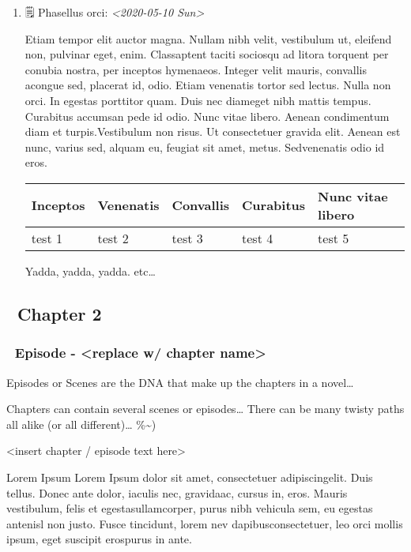 \documentclass[11pt]{article}
\begin{document}
\begin{enumerate}
\item 🗒 Phasellus orci: \textit{<2020-05-10 Sun>}
\label{sec:org793ef59}

Etiam tempor elit auctor magna. Nullam nibh velit, vestibulum ut, eleifend non, pulvinar eget, enim. Classaptent taciti sociosqu ad litora torquent per conubia nostra, per inceptos hymenaeos. Integer velit mauris, convallis acongue sed, placerat id, odio. Etiam venenatis tortor sed lectus. Nulla non orci. In egestas porttitor quam. Duis nec diameget nibh mattis tempus. Curabitus accumsan pede id odio. Nunc vitae libero. Aenean condimentum diam et turpis.Vestibulum non risus. Ut consectetuer gravida elit. Aenean est nunc, varius sed, alquam eu, feugiat sit amet, metus. Sedvenenatis odio id eros.

\begin{center}
\begin{tabular}{lllll}
\hline
Inceptos & Venenatis & Convallis & Curabitus & Nunc vitae libero\\
\hline
test 1 & test 2 & test 3 & test 4 & test 5\\
\hline
\end{tabular}
\end{center}

Yadda, yadda, yadda. etc\ldots{}
\end{enumerate}



\subsection{🔖 Chapter 2}
\label{sec:orgd3319af}

\subsubsection{📄 Episode - <replace w/ chapter name>}
\label{sec:org9af18c4}
Episodes or Scenes are the DNA that make up the chapters in a novel\ldots{}  

Chapters can contain several scenes or episodes\ldots{} There can be many twisty paths all alike (or all different)\ldots{} \%\textasciitilde{})

<insert chapter / episode text here>

Lorem Ipsum Lorem Ipsum dolor sit amet, consectetuer adipiscingelit. Duis tellus. Donec ante dolor, iaculis nec, gravidaac, cursus in, eros. Mauris vestibulum, felis et egestasullamcorper, purus nibh vehicula sem, eu egestas antenisl non justo. Fusce tincidunt, lorem nev dapibusconsectetuer, leo orci mollis ipsum, eget suscipit erospurus in ante. 
\end{document}

